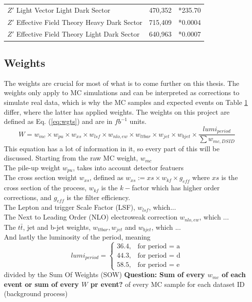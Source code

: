 \documentclass[12pt, a4paper]{book}
\begin{document}
\begin{table}[!h]
\begin{tabular}{l|r|r}
      $Z'$ Light Vector Light Dark Sector                                             & 470,352               & *235.70         \\
      $Z'$ Effective Field Theory Heavy Dark Sector                                   & 715,409               & *0.0004           \\
      $Z'$ Effective Field Theory Light Dark Sector                                   & 640,963               & *0.0007          \\\midrule\midrule
   \end{tabular}
   \label{tab:dataset}
\end{table}

\subsection{Weights}\label{sec:wgts}
The weights are crucial for most of what is to come further on this thesis. The weights only apply to MC simulations and can be interpreted as corrections to simulate real data, which is why the MC samples and expected events on Table \ref{tab:dataset} differ, where the 
latter has applied weights. The weights on this project are defined as Eq. (\ref{eq:wgts}) and are in $fb^{-1}$ units.
\begin{equation}\label{eq:wgts}
   W = w_{mc}\times w_{pu}\times w_{xs}\times w_{lsf} \times w_{nlo,ew} \times w_{ttbar} \times w_{jet} \times w_{bjet} \times \frac{lumi_{period}}{\sum w_{mc, DSID}}
\end{equation}
This equation has a lot of information in it, so every part of this will be discussed. Starting from the raw MC weight, $w_{mc}$\\
The pile-up weight $w_{pu}$, takes into account detector featuers\\
The cross section weight $w_{xs}$, defined as $w_{xs} := xs \times w_{kf} \times g_{eff}$ where $xs$ is the cross section of the process, $w_{kf}$ is the $k-$factor which has higher order corrections, and $g_{eff}$ is the filter efficiency.\\
The Lepton and trigger Scale Factor (LSF), $w_{lsf}$, which...\\
The Next to Leading Order (NLO) electroweak correction $w_{nlo,ew}$, which ...\\
The $t\bar{t}$, jet and b-jet weights, $w_{ttbar}, w_{jet}$ and $w_{bjet}$, which ...\\
And lastly the luminosity of the period, meaning
$$
lumi_{period} = \begin{cases}
               36.4,& \text{for period = a}\\
               44.3,& \text{for  period = d}\\
               58.5,& \text{for  period = e}
               \end{cases}
$$
divided by the Sum Of Weights (SOW) \textbf{Question: Sum of every $w_{mc}$ of each event or sum of every $W$ pr event? } of every MC sample for each dataset ID (background process)
\end{document}
